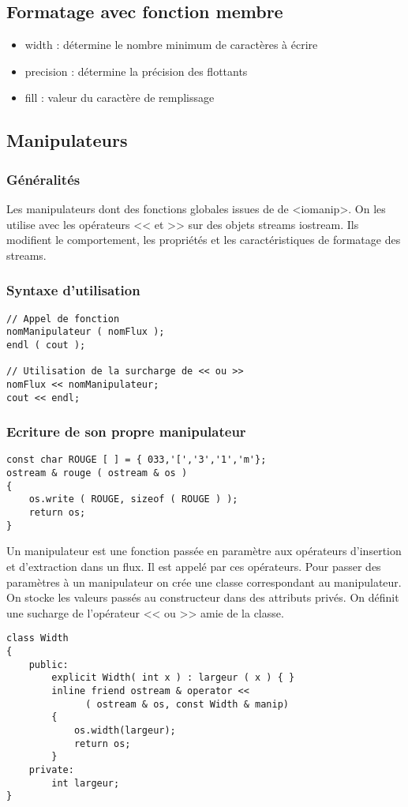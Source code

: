 \documentclass[10pt,a4paper,twoside]{article}
\begin{document}
\subsection{Formatage avec fonction membre}
\begin{itemize}
\item width : détermine le nombre minimum de caractères à écrire
\item precision : détermine la précision des flottants
\item fill : valeur du caractère de remplissage
\end{itemize}

\subsection{Manipulateurs}
\subsubsection{Généralités}
Les manipulateurs dont des fonctions globales issues de de <iomanip>. On les utilise avec les opérateurs << et >> sur des objets streams iostream. Ils modifient le comportement, les propriétés et les caractéristiques de formatage des streams.

\subsubsection{Syntaxe d'utilisation}
\begin{verbatim}
// Appel de fonction
nomManipulateur ( nomFlux );
endl ( cout );

// Utilisation de la surcharge de << ou >>
nomFlux << nomManipulateur;
cout << endl;
\end{verbatim}

\subsubsection{Ecriture de son propre manipulateur}
\begin{verbatim}
const char ROUGE [ ] = { 033,'[','3','1','m'};
ostream & rouge ( ostream & os )
{
	os.write ( ROUGE, sizeof ( ROUGE ) );
	return os;
}
\end{verbatim}
Un manipulateur est une fonction passée en paramètre aux opérateurs d'insertion et d'extraction dans un flux. Il est appelé par ces opérateurs. Pour passer des paramètres à un manipulateur on crée une classe correspondant au manipulateur. On stocke les valeurs passés au constructeur dans des attributs privés. On définit une sucharge de l'opérateur << ou >> amie de la classe.
\begin{verbatim}
class Width
{
	public:
		explicit Width( int x ) : largeur ( x ) { }
		inline friend ostream & operator << 
		      ( ostream & os, const Width & manip)
		{	
			os.width(largeur);
			return os;
		}
	private:
		int largeur;
}
\end{verbatim}
\end{document}
